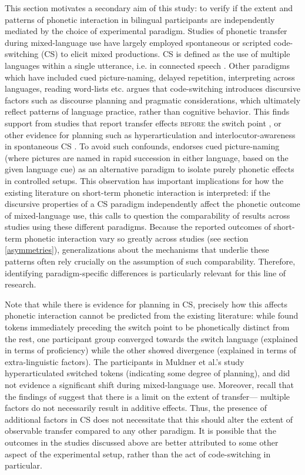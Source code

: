 \documentclass[12 pt]{article}
\begin{document}
This section motivates a secondary aim of this study: to verify if the extent and patterns of phonetic interaction in bilingual participants are independently mediated by the choice of experimental paradigm. Studies of phonetic transfer during mixed-language use have largely employed spontaneous or scripted code-switching (CS) to elicit mixed productions. CS is defined as the use of multiple languages within a single utterance, i.e. in connected speech \citep{myers1993dueling}. Other paradigms which have included cued picture-naming, delayed repetition, interpreting across languages, reading word-lists etc. \cite{olson2013bilingual} argues that code-switching introduces discursive factors such as discourse planning and pragmatic considerations, which ultimately reflect patterns of language practice, rather than cognitive behavior. This finds support from studies that report transfer effects \textsc{before} the switch point \citep{bullock2009trying}, or other evidence for planning such as hyperarticulation \citep{muldner2019phonetics} and interlocutor-awareness in spontaneous CS \citep{khattab2013phonetic}. To avoid such confounds, \cite{olson2013bilingual} endorses cued picture-naming (where pictures are named in rapid succession in either language, based on the given language cue) as an alternative paradigm to isolate purely phonetic effects in controlled setups. This observation has important implications for how the existing literature on short-term phonetic interaction is interpreted: if the discursive properties of a CS paradigm independently affect the phonetic outcome of mixed-language use, this calls to question the comparability of results across studies using these different paradigms. Because the reported outcomes of short-term phonetic interaction vary so greatly across studies (see section \ref{asymmetries}), generalizations about the mechanisms that underlie these patterns often rely crucially on the assumption of such comparability. Therefore, identifying paradigm-specific differences is particularly relevant for this line of research.

Note that while there is evidence for planning in CS, precisely how this affects phonetic interaction cannot be predicted from the existing literature: while \cite{bullock2009trying} found tokens immediately preceding the switch point to be phonetically distinct from the rest, one participant group converged towards the switch language (explained in terms of proficiency) while the other showed divergence (explained in terms of extra-linguistic factors). The participants in Muldner et al.'s \citeyearpar{muldner2019phonetics} study hyperarticulated switched tokens (indicating some degree of planning), and did not evidence a significant shift during mixed-language use. Moreover, recall that the findings of \cite{olson2016role} suggest that there is a limit on the extent of transfer--- multiple factors do not necessarily result in additive effects. Thus, the presence of additional factors in CS does not necessitate that this should alter the extent of observable transfer compared to any other paradigm. It is possible that the outcomes in the studies discussed above are better attributed to some other aspect of the experimental setup, rather than the act of code-switching in particular.
\end{document}
